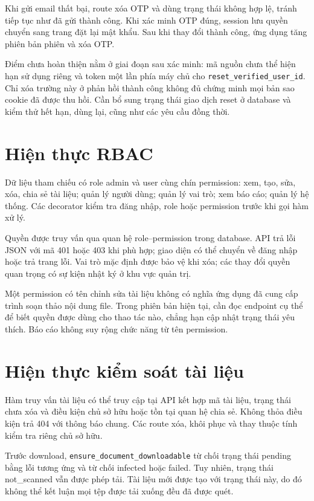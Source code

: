 Khi gửi email thất bại, route xóa OTP và dùng trạng thái không hợp lệ, tránh tiếp tục như đã gửi thành công. Khi xác minh OTP đúng, session lưu quyền chuyển sang trang đặt lại mật khẩu. Sau khi thay đổi thành công, ứng dụng tăng phiên bản phiên và xóa OTP.

Điểm chưa hoàn thiện nằm ở giai đoạn sau xác minh: mã nguồn chưa thể hiện hạn sử dụng riêng và token một lần phía máy chủ cho \texttt{reset\_verified\_user\_id}. Chỉ xóa trường này ở phản hồi thành công không đủ chứng minh mọi bản sao cookie đã được thu hồi. Cần bổ sung trạng thái giao dịch reset ở database và kiểm thử hết hạn, dùng lại, cũng như các yêu cầu đồng thời.

\section{Hiện thực RBAC}
Dữ liệu tham chiếu có role admin và user cùng chín permission: xem, tạo, sửa, xóa, chia sẻ tài liệu; quản lý người dùng; quản lý vai trò; xem báo cáo; quản lý hệ thống. Các decorator kiểm tra đăng nhập, role hoặc permission trước khi gọi hàm xử lý.

Quyền được truy vấn qua quan hệ role--permission trong database. API trả lỗi JSON với mã 401 hoặc 403 khi phù hợp; giao diện có thể chuyển về đăng nhập hoặc trả trang lỗi. Vai trò mặc định được bảo vệ khi xóa; các thay đổi quyền quan trọng có sự kiện nhật ký ở khu vực quản trị.

Một permission có tên chỉnh sửa tài liệu không có nghĩa ứng dụng đã cung cấp trình soạn thảo nội dung file. Trong phiên bản hiện tại, cần đọc endpoint cụ thể để biết quyền được dùng cho thao tác nào, chẳng hạn cập nhật trạng thái yêu thích. Báo cáo không suy rộng chức năng từ tên permission.

\section{Hiện thực kiểm soát tài liệu}
Hàm truy vấn tài liệu có thể truy cập tại API kết hợp mã tài liệu, trạng thái chưa xóa và điều kiện chủ sở hữu hoặc tồn tại quan hệ chia sẻ. Không thỏa điều kiện trả 404 với thông báo chung. Các route xóa, khôi phục và thay thuộc tính kiểm tra riêng chủ sở hữu.

Trước download, \texttt{ensure\_document\_downloadable} từ chối trạng thái pending bằng lỗi tương ứng và từ chối infected hoặc failed. Tuy nhiên, trạng thái not\_scanned vẫn được phép tải. Tài liệu mới được tạo với trạng thái này, do đó không thể kết luận mọi tệp được tải xuống đều đã được quét.

